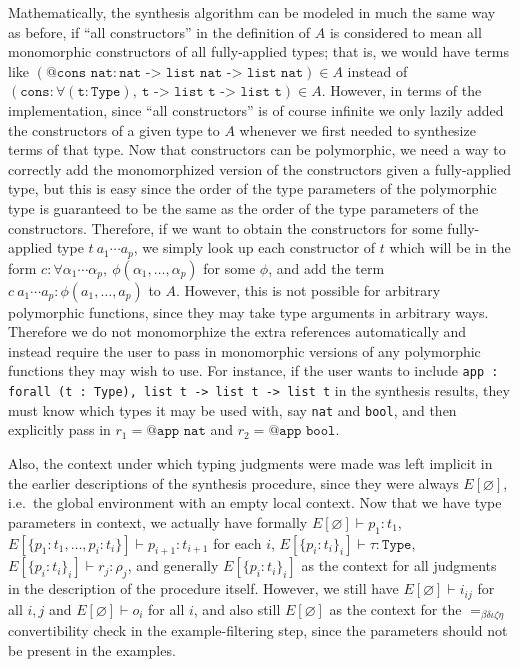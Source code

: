 \documentclass[11pt]{article}
\newcommand{\coq}[1]{\texttt{#1}}
\begin{document}
Mathematically, the synthesis algorithm can be modeled in much the same way as before, if ``all constructors'' in the definition of $A$ is considered to mean all monomorphic constructors of all fully-applied types; that is, we would have terms like $(\coq{@cons nat} : \coq{nat -> list nat -> list nat}) \in A$ instead of $(\coq{cons} : \forall (\coq{t} : \coq{Type}),\ \coq{t -> list t -> list t}) \in A$. However, in terms of the implementation, since ``all constructors'' is of course infinite we only lazily added the constructors of a given type to $A$ whenever we first needed to synthesize terms of that type. Now that constructors can be polymorphic, we need a way to correctly add the monomorphized version of the constructors given a fully-applied type, but this is easy since the order of the type parameters of the polymorphic type is guaranteed to be the same as the order of the type parameters of the constructors. Therefore, if we want to obtain the constructors for some fully-applied type $t\ a_1 \cdots a_p$, we simply look up each constructor of $t$ which will be in the form $c : \forall \alpha_1 \cdots \alpha_p,\ \phi(\alpha_1, \dots, \alpha_p)$ for some $\phi$, and add the term $c\ a_1 \cdots a_p : \phi(a_1, \dots, a_p)$ to $A$. However, this is not possible for arbitrary polymorphic functions, since they may take type arguments in arbitrary ways. Therefore we do not monomorphize the extra references automatically and instead require the user to pass in monomorphic versions of any polymorphic functions they may wish to use. For instance, if the user wants to include \coq{app : forall (t : Type), list t -> list t -> list t} in the synthesis results, they must know which types it may be used with, say \coq{nat} and \coq{bool}, and then explicitly pass in $r_1 = \coq{@app nat}$ and $r_2 = \coq{@app bool}$.

Also, the context under which typing judgments were made was left implicit in the earlier descriptions of the synthesis procedure, since they were always $E[\varnothing]$, i.e.\ the global environment with an empty local context. Now that we have type parameters in context, we actually have formally $E[\varnothing] \vdash p_1 : t_1$, $E[\{p_1 : t_1, \dots, p_i : t_i\}] \vdash p_{i+1} : t_{i+1}$ for each $i$, $E[\{p_i : t_i\}_i] \vdash \tau : \coq{Type}$, $E[\{p_i : t_i\}_i] \vdash r_j : \rho_j$, and generally $E[\{p_i : t_i\}_i]$ as the context for all judgments in the description of the procedure itself. However, we still have $E[\varnothing] \vdash i_{ij}$ for all $i, j$ and $E[\varnothing] \vdash o_i$ for all $i$, and also still $E[\varnothing]$ as the context for the $=_{\beta\delta\iota\zeta\eta}$ convertibility check in the example-filtering step, since the parameters should not be present in the examples.
\end{document}
